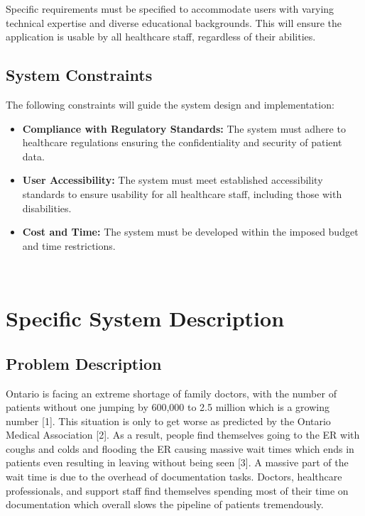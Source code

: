 \documentclass[12pt]{article}
\begin{document}
Specific requirements must be specified to accommodate users with varying technical expertise and diverse educational backgrounds. This will ensure the application is usable by all healthcare staff, regardless of their abilities.


\subsection{System Constraints}

The following constraints will guide the system design and implementation:

\begin{itemize} 

  \item \textbf{Compliance with Regulatory Standards:} The system must adhere to healthcare regulations ensuring the confidentiality and security of patient data.

  \item \textbf{User Accessibility:} The system must meet established accessibility standards to ensure usability for all healthcare staff, including those with disabilities.

  \item \textbf{Cost and Time:} The system must be developed within the imposed budget and time restrictions.

\end{itemize}


~\newpage

\section{Specific System Description} \label{sec_SpecificSystemDescription}


\subsection{Problem Description} \label{sec_ProblemDescription}

Ontario is facing an extreme shortage of family doctors, with the number of patients without one jumping by 600,000 to 2.5 million which is a growing number [1]. This situation is only to get worse as predicted by the Ontario Medical Association [2]. As a result, people find themselves going to the ER with coughs and colds and flooding the ER causing massive wait times which ends in patients even resulting in leaving without being seen [3]. A massive part of the wait time is due to the overhead of documentation tasks. Doctors, healthcare professionals, and support staff find themselves spending most of their time on documentation which overall slows the pipeline of patients tremendously.
\end{document}
